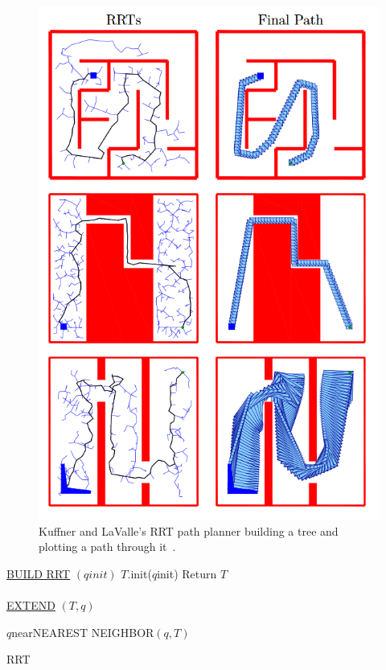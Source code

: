 \documentclass[journal]{IEEEtran}
\begin{document}
\begin{figure}[h]
	\includegraphics[width=1.0\linewidth]{KuffnerRRT.png}
	\caption{ Kuffner and LaValle's RRT path planner building a tree and plotting a path through it~\cite{Kuffner2000}.}
	\label{KuffnerRRT}
\end{figure} 

\begin{algorithm}
	\underline{BUILD RRT} $(qinit)$\;
	$T$.init($q$init)\;
	Return $T$ 
	\\\hrulefill
	\\  
	\underline{EXTEND} $(T,q)$ \;
	
	$q$near\gets NEAREST NEIGHBOR$(q,T)$ \; \\
	
	
	\caption{RRT}
\end{algorithm}
\end{document}
